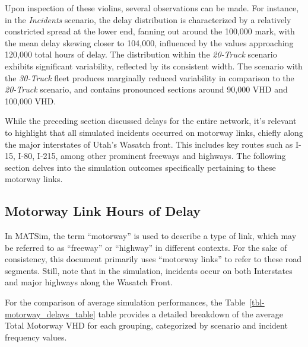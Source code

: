 \documentclass[fancy, oneside, mastersfancy, ms]{byuthesis}
\begin{document}
Upon inspection of these violins, several observations can be made. For
instance, in the \emph{Incidents} scenario, the delay distribution is
characterized by a relatively constricted spread at the lower end,
fanning out around the 100,000 mark, with the mean delay skewing closer
to 104,000, influenced by the values approaching 120,000 total hours of
delay. The distribution within the \emph{20-Truck} scenario exhibits
significant variability, reflected by its consistent width. The scenario
with the \emph{30-Truck} fleet produces marginally reduced variability
in comparison to the \emph{20-Truck} scenario, and contains pronounced
sections around 90,000 VHD and 100,000 VHD.

While the preceding section discussed delays for the entire network,
it's relevant to highlight that all simulated incidents occurred on
motorway links, chiefly along the major interstates of Utah's Wasatch
front. This includes key routes such as I-15, I-80, I-215, among other
prominent freeways and highways. The following section delves into the
simulation outcomes specifically pertaining to these motorway links.

\hypertarget{motorway-link-hours-of-delay}{%
\subsection{Motorway Link Hours of
Delay}\label{motorway-link-hours-of-delay}}

In MATSim, the term ``motorway'' is used to describe a type of link,
which may be referred to as ``freeway'' or ``highway'' in different
contexts. For the sake of consistency, this document primarily uses
``motorway links'' to refer to these road segments. Still, note that in
the simulation, incidents occur on both Interstates and major highways
along the Wasatch Front.

For the comparison of average simulation performances, the
Table~\ref{tbl-motorway_delays_table} table provides a detailed
breakdown of the average Total Motorway VHD for each grouping,
categorized by scenario and incident frequency values.
\end{document}
